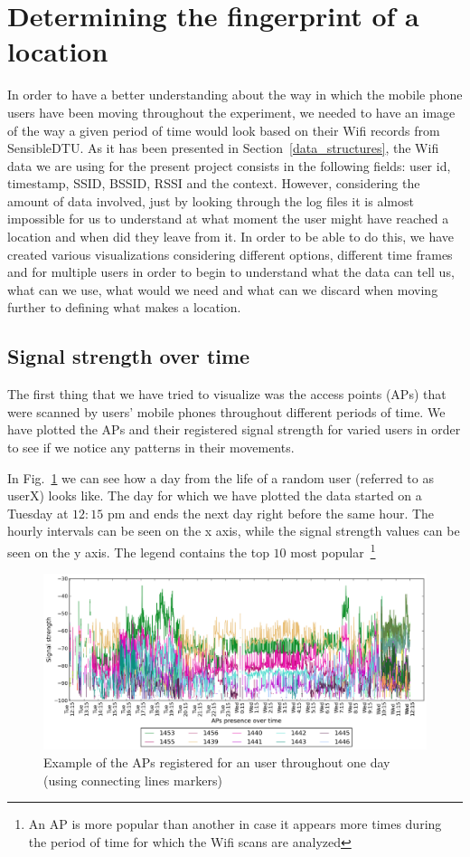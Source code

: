 \section{Determining the fingerprint of a location}
In order to have a better understanding about the way in which the mobile phone
users have been moving throughout the experiment, we needed to have an image of
the way a given period of time would look based on their Wifi records from
SensibleDTU. As it has been presented in Section~\ref{data_structures}, the Wifi
data we are using for the present project consists in the following fields:
user id, timestamp, SSID, BSSID, RSSI and the context. However, considering the
amount of data involved, just by looking through the log files it is almost
impossible for us to understand at what moment the user might have reached a
location and when did they leave from it. In order to be able to do this, we
have created various visualizations considering different options, different
time frames and for multiple users in order to begin to understand what the data
can tell us, what can we use, what would we need and what can we discard when
moving further to defining what makes a location.

\subsection{Signal strength over time}

The first thing that we have tried to visualize was the access points (APs) that
were scanned by users' mobile phones throughout different periods of time. We
have plotted the APs and their registered signal strength for varied users in
order to see if we notice any patterns in their movements.

In Fig.~\ref{user_6_1d_lines} we can see how a day from the life of a random
user (referred to as userX) looks like. The day for which we have plotted the
data started on a Tuesday at $12:15$ pm and ends the next day right before the
same hour. The hourly intervals can be seen on the x axis, while the signal
strength values can be seen on the y axis. The legend contains the top $10$ most
popular~\footnote{An AP is more popular than another in case it appears more
times during the period of time for which the Wifi scans are analyzed}

\begin{figure}[ht]
\centering
\includegraphics[height =
0.45\textwidth]{figures/user_6_sorted_1days_plot.png}
\caption{Example of the APs registered for an user throughout one day (using
connecting lines markers)}
\label{user_6_1d_lines}
\end{figure}

